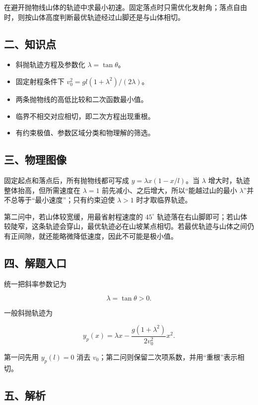 \documentclass[12pt,a4paper,UTF8]{ctexart}
\newcommand{\tightlist}{\setlength{\itemsep}{0pt}\setlength{\parskip}{0pt}}
\begin{document}
在避开抛物线山体的轨迹中求最小初速。固定落点时只需优化发射角；落点自由时，则按山体高度判断最优轨迹经过山脚还是与山体相切。

\subsection{二、知识点}\label{ux4e8cux77e5ux8bc6ux70b9-1}

\begin{itemize}
\tightlist
\item
  斜抛轨迹方程及参数化 \(\lambda=\tan\theta\)。
\item
  固定射程条件下 \(v_0^2=gl(1+\lambda^2)/(2\lambda)\)。
\item
  两条抛物线的高低比较和二次函数最小值。
\item
  临界不相交对应相切，即二次方程出现重根。
\item
  有约束极值、参数区域分类和物理解的筛选。
\end{itemize}

\subsection{三、物理图像}\label{ux4e09ux7269ux7406ux56feux50cf-1}

固定起点和落点后，所有抛物线都可写成 \(y=\lambda x(1-x/l)\)。当
\(\lambda\) 增大时，轨迹整体抬高，但所需速度在 \(\lambda=1\)
前先减小、之后增大，所以``能越过山的最小
\(\lambda\)''并不总等于``最小速度''；只有约束迫使 \(\lambda>1\)
时才取临界轨迹。

第二问中，若山体较宽缓，用最省射程速度的 \(45^\circ\)
轨迹落在右山脚即可；若山体较陡窄，这条轨迹会穿山，最优轨迹必在山坡某点相切。若最优轨迹与山体之间仍有正间隙，就还能略微降低速度，因此不可能是极小值。

\subsection{四、解题入口}\label{ux56dbux89e3ux9898ux5165ux53e3-1}

统一把斜率参数记为

\[\lambda=\tan\theta>0.\]

一般斜抛轨迹为

\[y_p(x)=\lambda x-\frac{g(1+\lambda^2)}{2v_0^2}x^2. \tag{1}\]

第一问先用 \(y_p(l)=0\) 消去
\(v_0\)；第二问则保留二次项系数，并用``重根''表示相切。

\subsection{五、解析}\label{ux4e94ux89e3ux6790-1}
\end{document}
